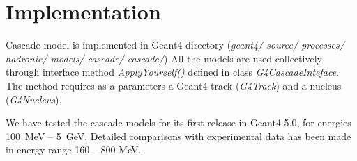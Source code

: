 \section{Implementation}


Cascade model is implemented in {\sc Geant4} directory ({\it geant4/ source/ processes/ hadronic/ models/ cascade/ cascade/})
All the models are used collectively through interface method {\it ApplyYourself()} defined in class {\it G4CascadeInteface}.
The method requires as a parameters a {\sc Geant4} track  ({\it G4Track}) and a nucleus ({\it G4Nucleus}). 

We have tested the cascade models for its first release in {\sc Geant4 5.0}, for energies 100~MeV -- 5~GeV. 
Detailed comparisons with experimental data has been made in energy range 160 -- 800 MeV. 

